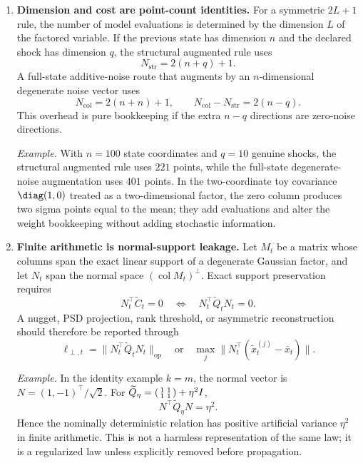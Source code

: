 \begin{enumerate}[label=(\roman*)]
  \item \textbf{Dimension and cost are point-count identities.}  For a
    symmetric $2L+1$ rule, the number of model evaluations is determined by the
    dimension $L$ of the factored variable.  If the previous state has dimension
    $n$ and the declared shock has dimension $q$, the structural augmented rule
    uses
    \[
      N_{\mathrm{str}}=2(n+q)+1.
    \]
    A full-state additive-noise route that augments by an $n$-dimensional
    degenerate noise vector uses
    \[
      N_{\mathrm{col}}=2(n+n)+1,
      \qquad
      N_{\mathrm{col}}-N_{\mathrm{str}}=2(n-q).
      \label{eq:bf-collapsed-point-count}
    \]
    This overhead is pure bookkeeping if the extra $n-q$ directions are
    zero-noise directions.

    \emph{Example.}  With $n=100$ state coordinates and $q=10$ genuine shocks,
    the structural augmented rule uses $221$ points, while the full-state
    degenerate-noise augmentation uses $401$ points.  In the two-coordinate toy
    covariance $\diag(1,0)$ treated as a two-dimensional factor, the zero
    column produces two sigma points equal to the mean; they add evaluations
    and alter the weight bookkeeping without adding stochastic information.

  \item \textbf{Finite arithmetic is normal-support leakage.}  Let $M_t$ be a
    matrix whose columns span the exact linear support of a degenerate
    Gaussian factor, and let $N_t$ span the normal space
    $(\operatorname{col}M_t)^\perp$.  Exact support preservation requires
    \[
      N_t^\top \widetilde C_t=0
      \quad\Longleftrightarrow\quad
      N_t^\top\widetilde Q_tN_t=0 .
      \label{eq:bf-collapsed-normal-support}
    \]
    A nugget, PSD projection, rank threshold, or asymmetric reconstruction
    should therefore be reported through
    \[
      \ell_{\perp,t}
      =
      \|N_t^\top\widetilde Q_tN_t\|_{\mathrm{op}}
      \quad\text{or}\quad
      \max_j\|N_t^\top(\widetilde x_t^{(j)}-\bar x_t)\|.
      \label{eq:bf-collapsed-support-leakage}
    \]

    \emph{Example.}  In the identity example $k=m$, the normal vector is
    $N=(1,-1)^\top/\sqrt2$.  For
    $\widetilde Q_\eta=
    \begin{psmallmatrix}1&1\\1&1\end{psmallmatrix}+\eta^2I$,
    \[
      N^\top\widetilde Q_\eta N=\eta^2.
    \]
    Hence the nominally deterministic relation has positive artificial
    variance $\eta^2$ in finite arithmetic.  This is not a harmless
    representation of the same law; it is a regularized law unless explicitly
    removed before propagation.


\end{enumerate}
